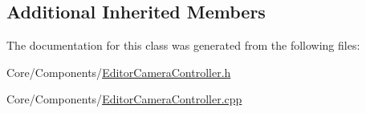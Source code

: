 \subsection*{Additional Inherited Members}


The documentation for this class was generated from the following files\-:\begin{DoxyCompactItemize}
\item 
Core/\-Components/\hyperlink{EditorCameraController_8h}{Editor\-Camera\-Controller.\-h}\item 
Core/\-Components/\hyperlink{EditorCameraController_8cpp}{Editor\-Camera\-Controller.\-cpp}\end{DoxyCompactItemize}
